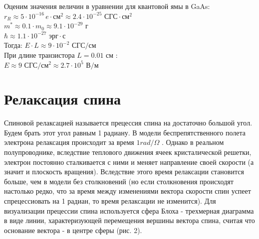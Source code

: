 \documentclass[12pt,oneside]{book}
\begin{document}
{{\begin{equation}
	\end{equation}
	Оценим значения величин в уравнении для квантовой ямы в GaAs: \\
	$r_R\approx{5}\cdot{10}^{-16} \,e\cdot\text{см}^2\approx{2.4}\cdot{10}^{-25}\text{ СГС}\cdot\text{см}^2$ \\
	$m^* \approx {0.1}\cdot{m_0}\approx{9.1}\cdot{10}^{-29}\text{ г}$ \\
	${\hbar}\approx{1.1}\cdot{10}^{-27}\text{ эрг}\cdot\text{с}$ \\
	Тогда: ${E}\cdot{L}\approx{9}\cdot{10}^{-2}\text{ СГС}/\text{см}$ \\
	При длине транзистора ${L = 0.01}$ см : \\
	$E\approx{9}\text{ СГС}/\text{см}^2\approx{2.7}\cdot{10}^{5}\text{ В}/\text{м}$
	

\section{Релаксация спина}
	Спиновой релаксацией называется прецессия спина на достаточно большой угол. Будем брать этот угол равным 1 радиану.
	\newline
	В модели беспрепятственного полета электрона релаксация происходит за время ${1 rad/\Omega}$ . Однако в реальном полупроводнике, вследствие теплового движения ячеек кристалической решетки, электрон постоянно сталкивается с ними и меняет направление своей скорости (а значит и плоскость вращения). Вследствие этого время релаксации становится больше, чем в модели без столкновений (но если столкновения происходят настолько редко, что за время между изменениями вектора скорости спин успеет спрецессиовать на 1 радиан, то время релаксации не изменится). 
	\newline
	\newline
	Для визуализации прецессии спина используется сфера Блоха - трехмерная диаграмма в виде линии, характеризующей перемещения вершины вектора спина, считая что основание вектора - в центре сферы (рис. 2).
		\begin{figure}[h!]
		\centering

\end{figure}}}
\end{document}
